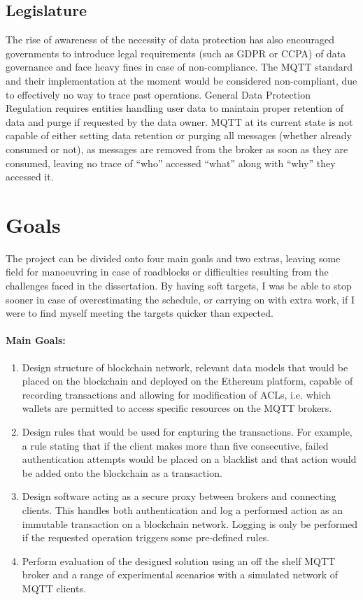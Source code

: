 \subsection{Legislature}
The rise of awareness of the necessity of data protection has also encouraged governments to introduce legal requirements (such as GDPR or CCPA) of data governance and face heavy fines in case of non-compliance. The MQTT standard and their implementation at the moment would be considered non-compliant, due to effectively no way to trace past operations. General Data Protection Regulation requires entities handling user data to maintain proper retention of data and purge if requested by the data owner. MQTT at its current state is not capable of either setting data retention or purging all messages (whether already consumed or not), as messages are removed from the broker as soon as they are consumed, leaving no trace of ``who'' accessed ``what'' along with ``why'' they accessed it.


\section{Goals}

The project can be divided onto four main goals and two extras, leaving some field for manoeuvring in case of roadblocks or difficulties resulting from the challenges faced in the dissertation. By having soft targets, I was be able to stop sooner in case of overestimating the schedule, or carrying on with extra work, if I were to find myself meeting the targets quicker than expected. 

\paragraph{Main Goals:}
\begin{enumerate}
  \item Design structure of blockchain network, relevant data models that would be placed on the blockchain and deployed on the Ethereum platform, capable of recording transactions and allowing for modification of ACLs, i.e. which wallets are permitted to access specific resources on the MQTT brokers.
  \item Design rules that would be used for capturing the transactions. For example, a rule stating that if the client makes more than five consecutive, failed authentication attempts would be placed on a blacklist and that action would be added onto the blockchain as a transaction. 
  \item Design software acting as a secure proxy between brokers and connecting clients. This handles both authentication and log a performed action as an immutable transaction on a blockchain network. Logging is only be performed if the requested operation triggers some pre-defined rules.
  \item Perform evaluation of the designed solution using an off the shelf MQTT broker and a range of experimental scenarios with a simulated network of MQTT clients.
\end{enumerate}

